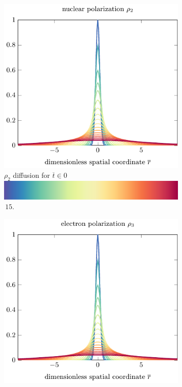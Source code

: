 \documentclass[onecolumn]{amsart}
\begin{document}
\begin{figure}
\begin{subfigure}[b]{.5\linewidth}
\centering
\includegraphics[width=.95\linewidth]{figures/rho_2_snapshots_standalone.pdf}
\caption{\small $\rho_2$ diffusion for $\overline{t} \in 0$\,\includegraphics[height=1.5ex,width=.5in]{figures/colorbar.pdf}\,$15$.}\label{fig:1a}
\end{subfigure}%
\begin{subfigure}[b]{.5\linewidth}
\centering
\includegraphics[width=.95\linewidth]{figures/rho_3_snapshots_standalone.pdf}

\end{subfigure}
\end{figure}
\end{document}
